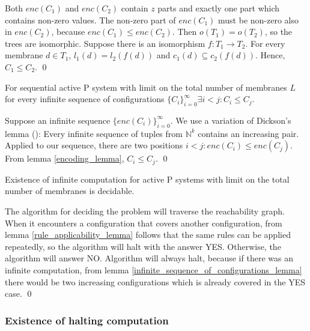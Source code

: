 \begin{dokaz}
  Both $enc(C_1)$ and $enc(C_2)$ contain $z$ parts and exactly one part which contains non-zero values. The non-zero part of $enc(C_1)$ must be non-zero also in $enc(C_2)$, because $enc(C_1)\leq enc(C_2)$. Then $o(T_1)=o(T_2)$, so the trees are isomorphic. Suppose there is an isomorphism $f:T_1\rightarrow T_2$. For every membrane $d\in T_1$, $l_1(d)=l_2(f(d))$ and $c_1(d)\subseteq c_2(f(d))$. Hence, $C_1\leq C_2$.
  \qed
\end{dokaz}

\begin{lemma}
\label{infinite_sequence_of_configurations_lemma}
  For sequential active P system with limit on the total number of membranes $L$ for every infinite sequence of configurations $\{C_i\}_{i=0}^\infty\exists i<j: C_i\leq C_j$.
\end{lemma}

\begin{dokaz}
  Suppose an infinite sequence $\{enc(C_i)\}_{i=0}^\infty$. We use a variation of Dickson's lemma (\cite{Figueira11Dickson}): Every infinite sequence of tuples from $\mathbb N^k$ contains an increasing pair. Applied to our sequence, there are two positions $i<j: enc(C_i)\leq enc(C_j)$. From lemma \ref{encoding_lemma}, $C_i\leq C_j$.
  \qed
\end{dokaz}

\begin{veta}
  Existence of infinite computation for active P systems with limit on the total number of membranes is decidable.
\end{veta}

\begin{dokaz}
  The algorithm for deciding the problem will traverse the  reachability graph. When it encounters a configuration that covers another configuration, from lemma \ref{rule_applicability_lemma} follows that the same rules can be applied repeatedly, so the algorithm will halt with the answer YES.
  Otherwise, the algorithm will answer NO.
  Algorithm will always halt, because if there was an infinite computation, from lemma \ref{infinite_sequence_of_configurations_lemma} there would be two increasing configurations which is already covered in the YES case.
  \qed
\end{dokaz}


\subsubsection{Existence of halting computation} %
\label{ssub:existence_of_halting_computation}

